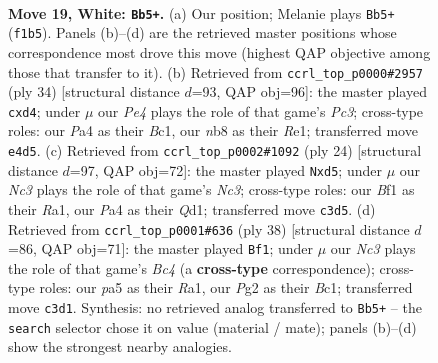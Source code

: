 \documentclass[11pt]{article}
\begin{document}
\clearpage

\begin{figure}[p]\centering
\begin{subfigure}{0.46\textwidth}\centering
\resizebox{\linewidth}{!}{%
\newchessgame
\chessboard[
  setfen={rnbqk1r1/4bp2/1p1p4/p1pn4/P3P2B/2N2N1P/RP1Q2P1/4KB1R w Kq - 0 19},
  showmover=false,
  pgfstyle=straightmove, color=movearrow, markmove={f1-b5}
]}
\caption{}
\end{subfigure}\hfill
\begin{subfigure}{0.46\textwidth}\centering
\resizebox{\linewidth}{!}{%
\newchessgame
\chessboard[
  setfen={rnb1k2r/4bppp/1p2p3/2qpP3/3n3P/pBP2N2/P2Q1PP1/R1B1R1K1 w kq - 0 18},
  showmover=false,
  pgfstyle=straightmove, color=movearrow, markmove={c3-d4}
]}
\caption{}
\end{subfigure}
\\[4pt]
\begin{subfigure}{0.46\textwidth}\centering
\resizebox{\linewidth}{!}{%
\newchessgame
\chessboard[
  setfen={r1bqr1k1/pp3pbp/n1p3p1/3n4/3NP3/2N1BP2/PP2B1PP/R2QR1K1 w - - 0 13},
  showmover=false,
  pgfstyle=straightmove, color=movearrow, markmove={c3-d5}
]}
\caption{}
\end{subfigure}\hfill
\begin{subfigure}{0.46\textwidth}\centering
\resizebox{\linewidth}{!}{%
\newchessgame
\chessboard[
  setfen={1k1r1b1r/1pp1q1pb/p4p1p/P3n3/2BP4/2P1PN2/6PP/R1BQR1K1 w - - 2 20},
  showmover=false,
  pgfstyle=straightmove, color=movearrow, markmove={c4-f1}
]}
\caption{}
\end{subfigure}
\caption{\textbf{Move 19, White: \texttt{Bb5+}.} (a) Our position; Melanie plays \texttt{Bb5+} (\texttt{f1b5}). Panels (b)--(d) are the retrieved master positions whose correspondence most drove this move (highest QAP objective among those that transfer to it). (b) Retrieved from \texttt{ccrl\_top\_p0000\#2957} (ply 34) [structural distance $d$=93, QAP obj=96]: the master played \texttt{cxd4}; under $\mu$ our \emph{Pe4} plays the role of that game's \emph{Pc3}; cross-type roles: our \emph{P}a4 as their \emph{B}c1, our \emph{n}b8 as their \emph{R}e1; transferred move \texttt{e4d5}. (c) Retrieved from \texttt{ccrl\_top\_p0002\#1092} (ply 24) [structural distance $d$=97, QAP obj=72]: the master played \texttt{Nxd5}; under $\mu$ our \emph{Nc3} plays the role of that game's \emph{Nc3}; cross-type roles: our \emph{B}f1 as their \emph{R}a1, our \emph{P}a4 as their \emph{Q}d1; transferred move \texttt{c3d5}. (d) Retrieved from \texttt{ccrl\_top\_p0001\#636} (ply 38) [structural distance $d$=86, QAP obj=71]: the master played \texttt{Bf1}; under $\mu$ our \emph{Nc3} plays the role of that game's \emph{Bc4} (a \textbf{cross-type} correspondence); cross-type roles: our \emph{p}a5 as their \emph{R}a1, our \emph{P}g2 as their \emph{B}c1; transferred move \texttt{c3d1}. Synthesis: no retrieved analog transferred to \texttt{Bb5+} -- the \texttt{search} selector chose it on value (material / mate); panels (b)--(d) show the strongest nearby analogies.}
\label{fig:thought-m36}
\end{figure}
\end{document}
